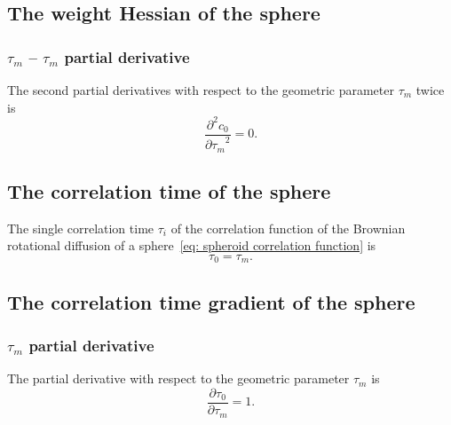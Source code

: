 
\subsection{The weight Hessian of the sphere}


\subsubsection{$\tau_m$ -- $\tau_m$ partial derivative}

The second partial derivatives with respect to the geometric parameter $\tau_m$ twice is
\begin{equation}
    \frac{\partial^2 c_{0}}{{\partial \tau_m}^2} = 0.
\end{equation}




\subsection{The correlation time of the sphere}

The single correlation time $\tau_i$ of the correlation function of the Brownian rotational diffusion of a sphere~\eqref{eq: spheroid correlation function} is
\begin{equation}
    \tau_{0} = \tau_m.
\end{equation}




\subsection{The correlation time gradient of the sphere}


\subsubsection{$\tau_m$ partial derivative}

The partial derivative with respect to the geometric parameter $\tau_m$ is
\begin{equation}
    \frac{\partial \tau_{0}}{\partial \tau_m} = 1.
\end{equation}



